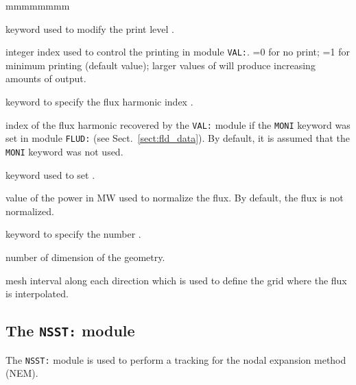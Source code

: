 \begin{ListeDeDescription}{mmmmmmmm}

\item[\moc{EDIT}] keyword used to modify the print level .

\item[\dusa{iprint}] integer index used to control  the printing in module {\tt VAL:}.
=0 for no print; =1 for minimum printing (default value); larger values of 
will produce increasing amounts of output.

\item[\moc{MODE}] keyword to specify the flux harmonic index .

\item[\dusa{imode}] index of the flux harmonic recovered by the {\tt VAL:} module if the {\tt MONI} keyword was set in module {\tt FLUD:}
(see Sect.~\ref{sect:fld_data}). By default, it is assumed that the {\tt MONI} keyword was not used.

\item[\moc{POWR}] keyword used to set .

\item[\dusa{power}] value of the power in MW used to normalize the flux. By default, the flux is not normalized.

\item[\moc{DIM}] keyword to specify the number .

\item[\dusa{dim}] number of dimension of the geometry. 

\item[\dusa{dxyz}] mesh interval along each direction which is used to define the grid where the flux is interpolated. 

\end{ListeDeDescription}

\clearpage

\subsection{The {\tt NSST:} module}

The {\tt NSST:} module is used to perform a {\sc tracking} for the nodal
expansion method (NEM).\cite{brisingr}

\vskip 0.08cm


